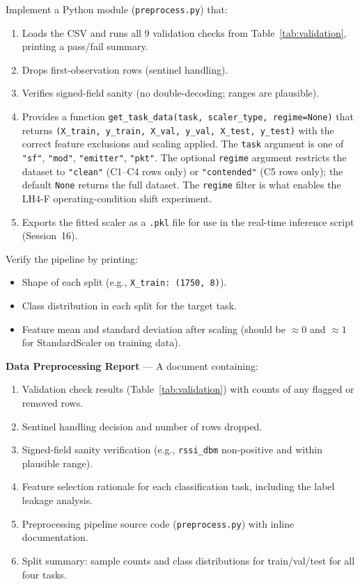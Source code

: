 \documentclass[11pt,letterpaper]{article}
\begin{document}
	\begin{tcolorbox}[infobox={Exercise: Build the Preprocessing Pipeline}]
		Implement a Python module (\texttt{preprocess.py}) that:
		\begin{enumerate}
			\item Loads the CSV and runs all 9 validation checks from Table~\ref{tab:validation}, printing a pass/fail summary.
			\item Drops first-observation rows (sentinel handling).
			\item Verifies signed-field sanity (no double-decoding; ranges are plausible).
			\item Provides a function \texttt{get\_task\_data(task, scaler\_type, regime=None)} that returns \texttt{(X\_train, y\_train, X\_val, y\_val, X\_test, y\_test)} with the correct feature exclusions and scaling applied. The \texttt{task} argument is one of \texttt{"sf"}, \texttt{"mod"}, \texttt{"emitter"}, \texttt{"pkt"}. The optional \texttt{regime} argument restricts the dataset to \texttt{"clean"} (C1--C4 rows only) or \texttt{"contended"} (C5 rows only); the default \texttt{None} returns the full dataset. The \texttt{regime} filter is what enables the LH4-F operating-condition shift experiment.
			\item Exports the fitted scaler as a \texttt{.pkl} file for use in the real-time inference script (Session~16).
		\end{enumerate}
		Verify the pipeline by printing:
		\begin{itemize}
			\item Shape of each split (e.g., \texttt{X\_train: (1750, 8)}).
			\item Class distribution in each split for the target task.
			\item Feature mean and standard deviation after scaling (should be $\approx 0$ and $\approx 1$ for StandardScaler on training data).
		\end{itemize}
	\end{tcolorbox}

	\begin{tcolorbox}[deliverable={Session 13 Deliverable}]
		\textbf{Data Preprocessing Report} --- A document containing:
		\begin{enumerate}
			\item Validation check results (Table~\ref{tab:validation}) with counts of any flagged or removed rows.
			\item Sentinel handling decision and number of rows dropped.
			\item Signed-field sanity verification (e.g., \texttt{rssi\_dbm} non-positive and within plausible range).
			\item Feature selection rationale for each classification task, including the label leakage analysis.
			\item Preprocessing pipeline source code (\texttt{preprocess.py}) with inline documentation.
			\item Split summary: sample counts and class distributions for train/val/test for all four tasks.
		\end{enumerate}
	\end{tcolorbox}
\end{document}
